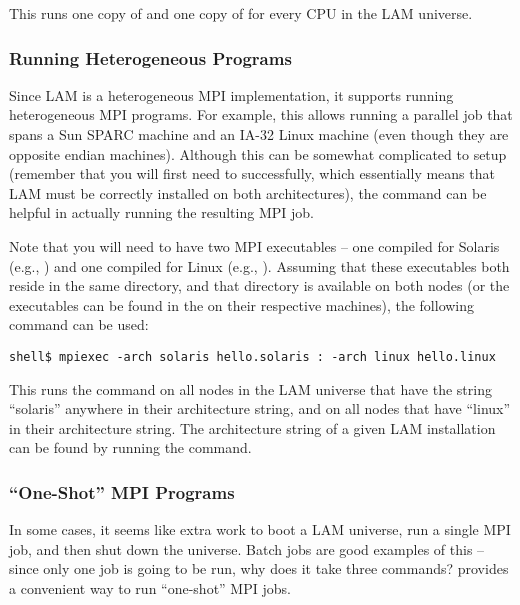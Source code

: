 This runs one copy of  and one copy of  for
every CPU in the LAM universe.


\subsubsection{Running Heterogeneous Programs}

Since LAM is a heterogeneous MPI implementation, it supports running
heterogeneous MPI programs.  For example, this allows running a
parallel job that spans a Sun SPARC machine and an IA-32 Linux machine
(even though they are opposite endian machines).  Although this can be
somewhat complicated to setup (remember that you will first need to
 successfully, which essentially means that LAM must be
correctly installed on both architectures), the  command
can be helpful in actually running the resulting MPI job.

Note that you will need to have two MPI executables -- one compiled
for Solaris (e.g., ) and one compiled for Linux
(e.g., ).  Assuming that these executables both
reside in the same directory, and that directory is available on both
nodes (or the executables can be found in the  on their
respective machines), the following command can be used:

\lstset{style=lam-cmdline}
\begin{lstlisting}
shell$ mpiexec -arch solaris hello.solaris : -arch linux hello.linux
\end{lstlisting}

This runs the  command on all nodes in the LAM
universe that have the string ``solaris'' anywhere in their
architecture string, and  on all nodes that have
``linux'' in their architecture string.  The architecture string of a
given LAM installation can be found by running the 
command.


\subsubsection{``One-Shot'' MPI Programs}

In some cases, it seems like extra work to boot a LAM universe, run
a single MPI job, and then shut down the universe.  Batch jobs are
good examples of this -- since only one job is going to be run, why
does it take three commands?   provides a convenient way
to run ``one-shot'' MPI jobs.

